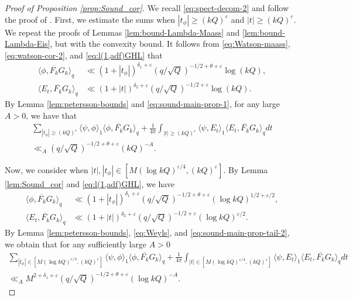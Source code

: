 \documentclass[12pt,reqno]{amsart}
\theoremstyle{remark}
\numberwithin{equation}{section}
\begin{document}
    \begin{proof}[Proof of Proposition \ref{prop:Sound_cor}] 
    We recall \eqref{eq:spect-decom-2} and follow the proof of \cite[Proposition 3.3]{H}. 
    First, we estimate the sums when $ |t_\phi|  \ge (kQ)^\varepsilon$ and $|t| \ge (kQ)^\varepsilon$. 
    We repeat the proofs of Lemmas \ref{lem:bound-Lambda-Maass} and \ref{lem:bound-Lambda-Eis}, but  with the convexity bound. It follows from \eqref{eq:Watson-maass}, \eqref{eq:watson-cor-2},   and \eqref{eq:l(1,adf)GHL} that
		\begin{equation}
			\label{eq:sound-main-prop-1}
			\begin{aligned}
                \langle \phi, \overline{F_k}G_k \rangle_q  &\ll  (1+|t_{\phi}|) ^{\delta_1+\varepsilon}(q/\sqrt{Q})^{-1/2+\theta+\varepsilon}\log(kQ),\\ 
                \langle E_t, \overline{F_k}G_k \rangle_q 
                &\ll (1+|t|)^{\delta_2+\varepsilon}(q/\sqrt{Q})^{-1/2+\varepsilon}\log(kQ).
			\end{aligned}
		\end{equation}
    By Lemma \ref{lem:petersson-bounds} and \eqref{eq:sound-main-prop-1}, for any large $A > 0$, we have that
\begin{multline}\label{eq:sound-main-prop-tail}
            \sum_{ |t_\phi|  \ge (kQ)^{\varepsilon}} \langle \psi, \phi \rangle_1 \langle \phi, \overline{F_k}G_k \rangle_q + \frac{1}{4\pi}\int_{|t|\ge (kQ)^{\varepsilon}} \langle \psi, E_t \rangle_1 \langle E_t, \overline{F_k}G_k \rangle_q dt \\
            \ll_{A}(q/\sqrt{Q})^{-1/2+\theta+\varepsilon}(kQ)^{-A}.
		\end{multline} 

        
		Now, we consider  when $|t|, |t_\phi|  \in [M (\log kQ)^{\varepsilon/4}, (kQ)^\varepsilon]$. By Lemma \ref{lem:Sound_cor} and \eqref{eq:l(1,adf)GHL}, we have 
		\begin{equation}
			\label{eq:sound-main-prop-tail-2}
			\begin{aligned}
				\langle \phi, \overline{F_k}G_k \rangle_q &\ll  (1+|t_{\phi}|) ^{\delta_1+\varepsilon} (q/\sqrt{Q})^{-1/2+\theta+\varepsilon}(\log kQ)^{1/2+{\varepsilon}/{2}},\\
				\langle E_t, \overline{F_k}G_k \rangle_q &\ll (1+|t|)^{\delta_2+\varepsilon} (q/\sqrt{Q})^{-1/2+\varepsilon}(\log kQ)^{{\varepsilon}/{2}}.
			\end{aligned}
		\end{equation}
       By Lemma \ref{lem:petersson-bounds}, \eqref{eq:Weyls}, and  \eqref{eq:sound-main-prop-tail-2}, we obtain that for any sufficiently large $A > 0$
        \begin{multline}
        \label{eq:sound-main-prop-tail-4}
			\sum_{ |t_\phi|  \in [M(\log kQ)^{\varepsilon/4}, (kQ)^\varepsilon]}\langle \psi, \phi \rangle_1 \langle \phi, \overline{F_k}G_k \rangle_q + \frac{1}{4\pi}\int_{|t| \in [M(\log kQ)^{\varepsilon/4}, (kQ)^\varepsilon]} \langle \psi, E_t \rangle_1 \langle E_t, \overline{F_k}G_k \rangle_q dt\\
             \ll_A M^{2+\delta_1+\varepsilon}(q/\sqrt{Q})^{-1/2+\theta+\varepsilon}(\log kQ)^{-A}.
		\end{multline}
  

\end{proof}
\end{document}
